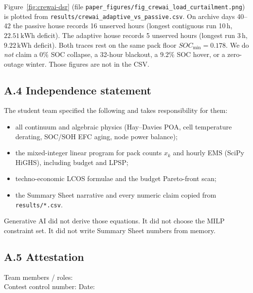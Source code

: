 Figure~\ref{fig:crewai-dsr} (file
\texttt{paper\_figures/fig\_crewai\_load\_curtailment.png})
is plotted from
\texttt{results/crewai\_adaptive\_vs\_passive.csv}.
On archive days 40--42 the passive house records
16 unserved hours (longest contiguous run 10\,h,
$22.51\,\mathrm{kWh}$ deficit). The adaptive house records
5 unserved hours (longest run 3\,h, $9.22\,\mathrm{kWh}$ deficit).
Both traces rest on the same pack floor $SOC_{\min}=0.178$.
We do \emph{not} claim a $0\%$ SOC collapse, a 32-hour blackout, a
$9.2\%$ SOC hover, or a zero-outage winter. Those figures are not in
the CSV.

\subsection*{A.4 Independence statement}

The student team specified the following and takes responsibility for them:
\begin{itemize}
  \item all continuum and algebraic physics (Hay--Davies POA, cell
        temperature derating, SOC/SOH EFC aging, node power balance);
  \item the mixed-integer linear program for pack counts \(x_k\) and
        hourly EMS (SciPy HiGHS), including budget and LPSP;
  \item techno-economic LCOS formulae and the budget Pareto-front scan;
  \item the Summary Sheet narrative and every numeric claim copied from
        \texttt{results/*.csv}.
\end{itemize}
Generative AI did not derive those equations. It did not choose the MILP
constraint set. It did not write Summary Sheet numbers from memory.

\subsection*{A.5 Attestation}

\begin{flushleft}
Team members / roles: \underline{\hspace{3.4in}}\\[1.15em]
Contest control number: \underline{\hspace{1.4in}}
\hfill Date: \underline{\hspace{1.4in}}
\end{flushleft}
